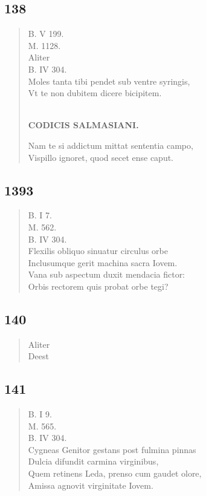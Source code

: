 \documentclass[11pt, a4paper]{report}
\begin{document}
            \subsection*{138}
      \begin{verse}
      B. V 199. \\ M. 1128. \\ Aliter \\ B. IV 304. \\ Moles tanta tibi pendet sub ventre syringis, \\ Vt te non dubitem dicere bicipitem. \\ 
        ﻿\pagebreak 
     \marginpar{[141]} \begin{center} \textbf{CODICIS SALMASIANI.} \end{center}Nam te si addictum mittat sententia campo, \\ Vispillo ignoret, quod secet ense caput. \\ 
      \end{verse}
  
            \subsection*{1393}
      \begin{verse}
      B. I 7. \\ M. 562. \\ B. IV 304. \\ Flexilis obliquo sinuatur circulus orbe \\ Inclusumque gerit machina sacra Iovem. \\ Vana sub aspectum duxit mendacia fictor: \\ Orbis rectorem quis probat orbe tegi? \\ 
      \end{verse}
  
            \subsection*{140}
      \begin{verse}
      Aliter \\ Deest \\ 
      \end{verse}
  
            \subsection*{141}
      \begin{verse}
      B. I 9. \\ M. 565. \\ B. IV 304. \\ Cygneas Genitor gestans post fulmina pinnas \\ Dulcia difundit carmina virginibus, \\ Quem retinens Leda, prenso cum gaudet olore, \\ Amissa agnovit virginitate Iovem. \\ 
      \end{verse}
  
\end{document}
